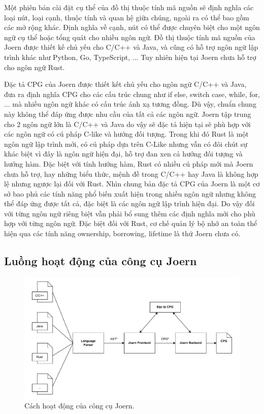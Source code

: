 Một phiên bản cài đặt cụ thể của đồ thị thuộc tính mã nguồn sẽ định nghĩa các loại nút, loại cạnh, thuộc tính và quan hệ giữa chúng, ngoài ra có thể bao gồm các mở rộng khác. Định nghĩa về cạnh, nút có thể được chuyên biệt cho một ngôn ngữ cụ thể hoặc tổng quát cho nhiều ngôn ngữ. Đồ thị thuộc tính mã nguồn của Joern được thiết kế chủ yếu cho C/C++ và Java, và cũng có hỗ trợ ngôn ngữ lập trình khác như Python, Go, TypeScript, ... Tuy nhiên hiện tại Joern chưa hỗ trợ cho ngôn ngữ Rust.

Đặc tả CPG của Joern được thiết kết chủ yếu cho ngôn ngữ C/C++ và Java, đưa ra định nghĩa CPG cho các cấu trúc chung như if else, switch case, while, for, ... mà nhiều ngôn ngữ khác có cấu trúc ánh xạ tương đồng. Dù vậy, chuẩn chung này không thể đáp ứng được nhu cầu của tất cả các ngôn ngữ. Joern tập trung cho 2 ngôn ngữ lớn là C/C++ và Java do vậy sẽ đặc tả hiện tại sẽ phù hợp với các ngôn ngữ có cú pháp C-like và hướng đối tượng. Trong khi đó Rust là một ngôn ngữ lập trình mới, có cú pháp dựa trên C-Like nhưng vẫn có đôi chút sự khác biệt vì đây là ngôn ngữ hiện đại, hỗ trợ đan xen cả hướng đối tượng và hướng hàm. Đặc biệt với tính hướng hàm, Rust có nhiều cú pháp mới mà Joern chưa hỗ trợ, hay những biểu thức, mệnh đề trong C/C++ hay Java là không hợp lệ nhưng ngược lại đối với Rust. Nhìn chung bản đặc tả CPG của Joern là một cơ sở bao phủ các tính năng phổ biến xuất hiện trong nhiều ngôn ngữ nhưng không thể đáp ứng được tất cả, đặc biệt là các ngôn ngữ lập trình hiện đại. Do vậy đối với từng ngôn ngữ riêng biệt vẫn phải bổ sung thêm các định nghĩa mới cho phù hợp với từng ngôn ngữ. Đặc biệt đối với Rust, cơ chế quản lý bộ nhớ an toàn thể hiện qua các tính năng ownership, borrowing, lifetime là thứ Joern chưa có.

\subsection{Luồng hoạt động của công cụ Joern}
\label{sec:joern_flow}

\begin{figure}[H]
  \includegraphics[width=1\columnwidth]{figures/c2/c2_frontend_backend.drawio.pdf}
  \centering
  \caption{Cách hoạt động của công cụ Joern.}
  \label{img:c2_frontend_backend}
\end{figure}

